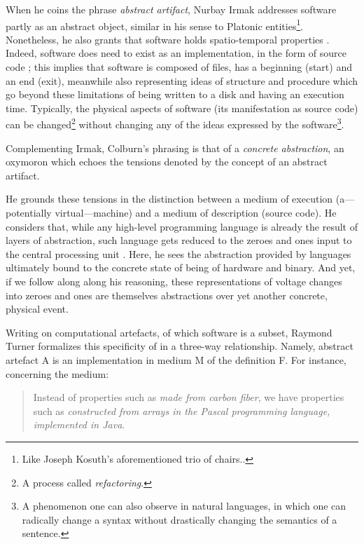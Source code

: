 When he coins the phrase \emph{abstract artifact}, Nurbay Irmak addresses software partly as an abstract object, similar in his sense to Platonic entities\footnote{Like Joseph Kosuth's aforementioned trio of chairs..}. Nonetheless, he also grants that software holds spatio-temporal properties \citep{irmak_software_2012}. Indeed, software does need to exist as an implementation, in the form of source code \citep{suber_what_1988}; this implies that software is composed of files, has a beginning (start) and an end (exit), meanwhile also representing ideas of structure and procedure which go beyond these limitations of being written to a disk and having an execution time. Typically, the physical aspects of software (its manifestation as source code) can be changed\footnote{A process called \emph{refactoring}.} without changing any of the ideas expressed by the software\footnote{A phenomenon one can also observe in natural languages, in which one can radically change a syntax without drastically changing the semantics of a sentence.}.

Complementing Irmak, Colburn's phrasing is that of a \emph{concrete abstraction}, an oxymoron which echoes the tensions denoted by the concept of an abstract artifact. 

He grounds these tensions in the distinction between a medium of execution (a—potentially virtual—machine) and a medium of description (source code). He considers that, while any high-level programming language is already the result of layers of abstraction, such language gets reduced to the zeroes and ones input to the central processing unit \citep{colburn_philosophy_2000}. Here, he sees the abstraction provided by languages ultimately bound to the concrete state of being of hardware and binary. And yet, if we follow along along his reasoning, these representations of voltage changes into zeroes and ones are themselves abstractions over yet another concrete, physical event.

Writing on computational artefacts, of which software is a subset, Raymond Turner formalizes this specificity of in a three-way relationship. Namely, abstract artefact A is an implementation in medium M of the definition F. For instance, concerning the medium:

\begin{quote}
    Instead of properties such as \emph{made from carbon fiber}, we have properties such as \emph{constructed from arrays in the Pascal programming language, implemented in Java}. \citep{turner_computational_2018}
\end{quote}

